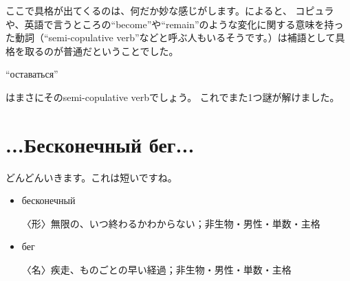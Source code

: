 \documentclass[12pt]{ltjsarticle}
\begin{document}
\bigskip

ここで具格が出てくるのは、何だか妙な感じがします。\citep[p. 205]{cubberley2002}によると、
コピュラや、英語で言うところの``become''や``remain''のような変化に関する意味を持った動詞（``semi-copulative verb''などと呼ぶ人もいるそうです。）は補語として具格を取るのが普通だということでした。
\begin{russian}``оставаться''\end{russian}はまさにそのsemi-copulative verbでしょう。
これでまた1つ謎が解けました。

\section{...Бесконечный бег...}
どんどんいきます。これは短いですね。
\begin{itemize}
    \item \begin{russian}бесконечный\end{russian}  〈形〉無限の、いつ終わるかわからない；非生物・男性・単数・主格
    \item \begin{russian}бег\end{russian}  〈名〉疾走、ものごとの早い経過；非生物・男性・単数・主格
\end{itemize}

\bigskip
\end{document}
